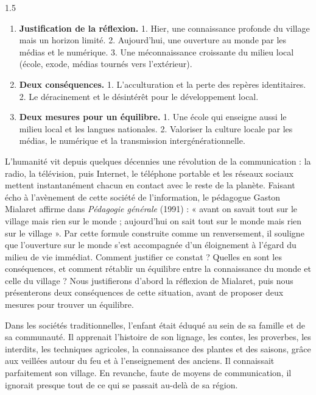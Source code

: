\documentclass[12pt]{article}
\begin{document}
\begin{spacing}{1.5}

\begin{enumerate}
\item[I.] \textbf{Justification de la réflexion.} 1. Hier, une connaissance profonde du village mais un horizon limité. 2. Aujourd'hui, une ouverture au monde par les médias et le numérique. 3. Une méconnaissance croissante du milieu local (école, exode, médias tournés vers l'extérieur).
\item[II.] \textbf{Deux conséquences.} 1. L'acculturation et la perte des repères identitaires. 2. Le déracinement et le désintérêt pour le développement local.
\item[III.] \textbf{Deux mesures pour un équilibre.} 1. Une école qui enseigne aussi le milieu local et les langues nationales. 2. Valoriser la culture locale par les médias, le numérique et la transmission intergénérationnelle.
\end{enumerate}



L'humanité vit depuis quelques décennies une révolution de la communication : la radio, la télévision, puis Internet, le téléphone portable et les réseaux sociaux mettent instantanément chacun en contact avec le reste de la planète. Faisant écho à l'avènement de cette société de l'information, le pédagogue Gaston Mialaret affirme dans \emph{Pédagogie générale} (1991) : « avant on savait tout sur le village mais rien sur le monde ; aujourd'hui on sait tout sur le monde mais rien sur le village ». Par cette formule construite comme un renversement, il souligne que l'ouverture sur le monde s'est accompagnée d'un éloignement à l'égard du milieu de vie immédiat. Comment justifier ce constat ? Quelles en sont les conséquences, et comment rétablir un équilibre entre la connaissance du monde et celle du village ? Nous justifierons d'abord la réflexion de Mialaret, puis nous présenterons deux conséquences de cette situation, avant de proposer deux mesures pour trouver un équilibre.


Dans les sociétés traditionnelles, l'enfant était éduqué au sein de sa famille et de sa communauté. Il apprenait l'histoire de son lignage, les contes, les proverbes, les interdits, les techniques agricoles, la connaissance des plantes et des saisons, grâce aux veillées autour du feu et à l'enseignement des anciens. Il connaissait parfaitement son village. En revanche, faute de moyens de communication, il ignorait presque tout de ce qui se passait au-delà de sa région.


\end{spacing}
\end{document}
